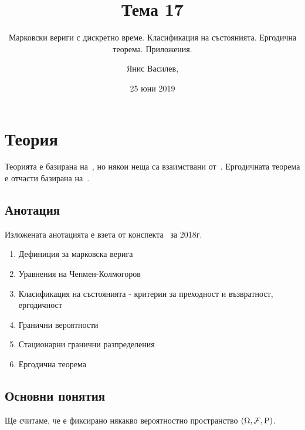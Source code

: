 \documentclass[numbers=endperiod, DIV=15, bibliography=totocnumbered]{scrartcl}
\title{Тема 17}
\subtitle{Марковски вериги с дискретно време. Класификация на състоянията. Ергодична теорема. Приложения.}
\author{Янис Василев, \Email{ianis@ivasilev.net}}
\date{25 юни 2019}
\begin{document}
\maketitle

\section{Теория}

Теорията е базирана на~\cite{Lectures}, но някои неща са взаимствани от~\cite{Borovkov}. Ергодичната теорема е отчасти базирана на~\cite{Ergodic}.

\subsection{Анотация}

Изложената анотацията е взета от конспекта~\cite{Syllabus} за 2018г.

\begin{enumerate}
  \item Дефиниция за марковска верига
  \item Уравнения на Чепмен-Колмогоров
  \item Класификация на състоянията - критерии за преходност и възвратност, ергодичност
  \item Гранични вероятности
  \item Стационарни гранични разпределения
  \item Ергодична теорема
\end{enumerate}

\subsection{Основни понятия}

Ще считаме, че е фиксирано някакво вероятностно пространство $(\Omega, \mathcal{F}, \operatorname{P})$.
\end{document}
